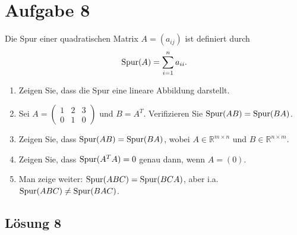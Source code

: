\documentclass[main.tex]{subfiles}
\begin{document}
\section{Aufgabe 8}
Die Spur einer quadratischen Matrix $A=(a_{ij})$ ist definiert durch
\[
    \operatorname{Spur} (A) = \sum_{i=1}^{n} a_{ii}.
\]

\begin{enumerate}
    \item Zeigen Sie, dass die Spur eine lineare Abbildung darstellt.
    \item Sei $A = \begin{pmatrix}
        1 & 2 & 3 \\
        0 & 1 & 0
    \end{pmatrix}$ und $B = A^T$. Verifizieren Sie $\operatorname{Spur} (AB)= \operatorname{Spur} (BA)$.
    \item Zeigen Sie, dass $\operatorname{Spur} (AB) = \operatorname{Spur} (BA)$, wobei $A \in \mathbb{R}^{m\times n}$ und $B\in \mathbb{R}^{n\times m}$.
    \item Zeigen Sie, dass $\operatorname{Spur} (A^T A) = 0$ genau dann, wenn $A=(0)$.
    \item Man zeige weiter: $\operatorname{Spur} (ABC) = \operatorname{Spur} (BCA)$, aber i.a. $\operatorname{Spur} (ABC) \neq \operatorname{Spur} (BAC)$.
\end{enumerate}

\subsection{Lösung 8}
\end{document}
